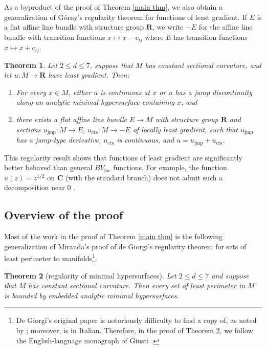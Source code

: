 \documentclass[reqno,11pt]{amsart}
\newcommand{\RR}{\mathbf{R}}
\newcommand{\CC}{\mathbf{C}}
\newcommand{\loc}{\mathrm{loc}}
\newtheorem{mainthm}{Theorem}
\theoremstyle{definition}
\numberwithin{equation}{section}
\begin{document}
As a byproduct of the proof of Theorem \ref{main thm}, we also obtain a generalization of G\'orny's regularity theorem \cite[Theorem 1.2]{górny2017planar} for functions of least gradient.
If $E$ is a flat affine line bundle with structure group $\RR$, we write $-E$ for the affine line bundle with transition functions $x \mapsto x - c_{ij}$ where $E$ has transition functions $x \mapsto x + c_{ij}$.

\begin{mainthm}\label{Gorny regularity}
Let $2 \leq d \leq 7$, suppose that $M$ has constant sectional curvature, and let $u: M \to \RR$ have least gradient.
Then:
\begin{enumerate}
\item For every $x \in M$, either $u$ is continuous at $x$ or $u$ has a jump discontinuity along an analytic minimal hypersurface containing $x$, and
\item there exists a flat affine line bundle $E \to M$ with structure group $\RR$ and sections $u_{\text{jmp}}: M \to E$, $u_{\text{cts}}: M \to -E$ of locally least gradient, such that $u_{\text{jmp}}$ has a jump-type derivative, $u_{\text{cts}}$ is continuous, and $u = u_{\text{jmp}} + u_{\text{cts}}$.
\end{enumerate}
\end{mainthm}

This regularity result shows that functions of least gradient are significantly better behaved than general $BV_\loc$ functions.
For example, the function $u(z) = z^{1/2}$ on $\CC$ (with the standard branch) does not admit such a decomposition near $0$ \cite[Example 4.1]{Ambrosio2000FunctionsOB}.


\subsection{Overview of the proof}
Most of the work in the proof of Theorem \ref{main thm} is the following generalization of Miranda's proof \cite{Miranda66} of de Giorgi's regularity theorem \cite{deGiorgi61} for sets of least perimeter to manifolds\footnote{De Giorgi's original paper \cite{deGiorgi61} is notoriously difficulty to find a copy of, as noted by \cite{Miranda66, Giusti77}; moreover, \cite{Miranda66} is in Italian. Therefore, in the proof of Theorem \ref{main lma}, we follow the English-language monograph of Giusti \cite[Part 1]{Giusti77}.}.

\begin{mainthm}[regularity of minimal hypersurfaces]\label{main lma}
Let $2 \leq d \leq 7$ and suppose that $M$ has constant sectional curvature.
Then every set of least perimeter in $M$ is bounded by embedded analytic minimal hypersurfaces.
\end{mainthm}
\end{document}
